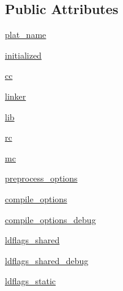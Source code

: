 \subsection*{Public Attributes}
\begin{DoxyCompactItemize}
\item 
\hyperlink{classsetuptools_1_1__distutils_1_1msvc9compiler_1_1MSVCCompiler_a566af5759a43d75dd7c8e28e5ca99dcd}{plat\+\_\+name}
\item 
\hyperlink{classsetuptools_1_1__distutils_1_1msvc9compiler_1_1MSVCCompiler_ad902b194a0747de0cc74ac098cd5a054}{initialized}
\item 
\hyperlink{classsetuptools_1_1__distutils_1_1msvc9compiler_1_1MSVCCompiler_a28531148c26076a51782939331c9013f}{cc}
\item 
\hyperlink{classsetuptools_1_1__distutils_1_1msvc9compiler_1_1MSVCCompiler_a530e7ce9bb0aae8f0f562a77140376c8}{linker}
\item 
\hyperlink{classsetuptools_1_1__distutils_1_1msvc9compiler_1_1MSVCCompiler_a2704c25c95a3c13d218f3833077a6308}{lib}
\item 
\hyperlink{classsetuptools_1_1__distutils_1_1msvc9compiler_1_1MSVCCompiler_aad2f5050f4a3d17d55b91b56b35d96cf}{rc}
\item 
\hyperlink{classsetuptools_1_1__distutils_1_1msvc9compiler_1_1MSVCCompiler_aa66be7495f08c6dff214f7ea07137a6c}{mc}
\item 
\hyperlink{classsetuptools_1_1__distutils_1_1msvc9compiler_1_1MSVCCompiler_a7843a1aae381de3c6406b44c1600e4a7}{preprocess\+\_\+options}
\item 
\hyperlink{classsetuptools_1_1__distutils_1_1msvc9compiler_1_1MSVCCompiler_afd522c16898c1708b1e4a04865f9f524}{compile\+\_\+options}
\item 
\hyperlink{classsetuptools_1_1__distutils_1_1msvc9compiler_1_1MSVCCompiler_abc30bf161486baa73a3d1ec6c3ac5656}{compile\+\_\+options\+\_\+debug}
\item 
\hyperlink{classsetuptools_1_1__distutils_1_1msvc9compiler_1_1MSVCCompiler_aab524e1d85d280093e9f64da0ad5ce7d}{ldflags\+\_\+shared}
\item 
\hyperlink{classsetuptools_1_1__distutils_1_1msvc9compiler_1_1MSVCCompiler_ae55d8345c222a0acad1885d61c40393f}{ldflags\+\_\+shared\+\_\+debug}
\item 
\hyperlink{classsetuptools_1_1__distutils_1_1msvc9compiler_1_1MSVCCompiler_a9f156bf5be22196414b8255287990c7f}{ldflags\+\_\+static}
\end{DoxyCompactItemize}
